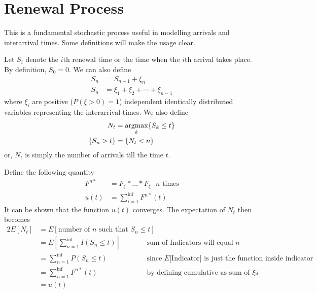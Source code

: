 \documentclass[../probability-notes.tex]{subfiles}
\begin{document}
    \section{Renewal Process}
    This is a fundamental stochastic process useful in modelling arrivals and interarrival times. Some definitions will make the usage clear.\newline

    Let $S_{i}$ denote the $i$th renewal time or the time when the $i$th arrival takes place. By definition, $S_{0} = 0$. We can also define
    \begin{align*}
        S_{n} &= S_{n-1} + \xi_{n}\\
        S_{n} &= \xi_{1} + \xi_{2} + \cdots + \xi_{n-1}
    \end{align*}
    where $\xi_{i}$ are positive ($P(\xi > 0) = 1$) independent identically distributed variables representing the interarrival times. We also define
    \begin{align*}
        N_{t} &= \operatorname*{argmax}_{k} \{ S_{k} \leq t \}\\
        \{ S_{n} > t \} &= \{ N_{t} < n \}
    \end{align*}
    or, $N_{t}$ is simply the number of arrivals till the time $t$.\newline

    Define the following quantity
    \begin{align*}
        F^{n*} &= F_{\xi} * \ldots * F_{\xi} \text{ $n$ times}\\
        u(t) &= \sum_{i=1}^{\inf} F^{n*}(t)
    \end{align*}
    It can be shown that the function $u(t)$ converges. The expectation of $N_{t}$ then becomes
    \begin{alignat*}{2}
        E[N_{t}] &= E[\text{number of $n$ such that $S_{n} \leq t$}]\\
        &= E[\sum_{n=1}^{\inf} I(S_{n} \leq t)] &\text{ sum of Indicators will equal $n$}\\
        &= \sum_{n=1}^{\inf} P(S_{n} \leq t) &\text{ since $E[$Indicator$]$ is just the function inside indicator}\\
        &= \sum_{n=1}^{\inf} F^{n*}(t) &\text{ by defining cumulative as sum of $\xi$s}\\
        &= u(t)
    \end{alignat*}
\end{document}

